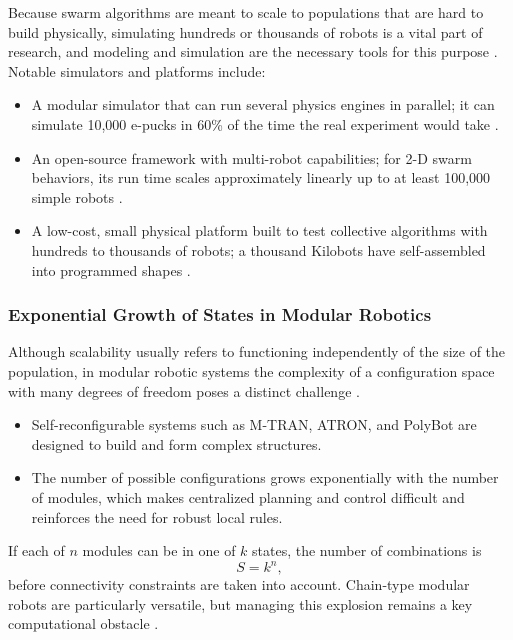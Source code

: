 Because swarm algorithms are meant to scale to populations that are hard to
build physically, simulating hundreds or thousands of robots is a vital part of
research, and modeling and simulation are the necessary tools for this purpose
\cite{dias2021swarm,hamann2018swarm}. Notable simulators and platforms include:
\begin{itemize}
  \item {} A modular simulator that can run several physics engines in
        parallel; it can simulate 10,000 e-pucks in 60\% of the time the real
        experiment would take \cite{dias2021swarm,pinciroli2012argos}.
  \item {} An open-source framework with multi-robot
        capabilities; for 2-D swarm behaviors, its run time scales approximately
        linearly up to at least 100,000 simple robots \cite{tan2016handbook}.
  \item {} A low-cost, small physical platform built to test collective
        algorithms with hundreds to thousands of robots; a thousand Kilobots have
        self-assembled into programmed shapes \cite{rubenstein2014programmable}.
\end{itemize}

\subsubsection{Exponential Growth of States in Modular Robotics}

Although scalability usually refers to functioning independently of the size of
the population, in modular robotic systems the complexity of a configuration
space with many degrees of freedom poses a distinct challenge \cite{yim2007modular}.
\begin{itemize}
  \item {} Self-reconfigurable systems such as M-TRAN, ATRON,
        and PolyBot are designed to build and form complex structures.
  \item {} The number of possible configurations grows
        exponentially with the number of modules, which makes centralized
        planning and control difficult and reinforces the need for robust local
        rules.
\end{itemize}
If each of $n$ modules can be in one of $k$ states, the number of combinations is
\begin{equation}
  S = k^{n},
  \label{eq:state-explosion}
\end{equation}
before connectivity constraints are taken into account. Chain-type modular robots
are particularly versatile, but managing this explosion remains a key
computational obstacle \cite{yim2007modular}.

